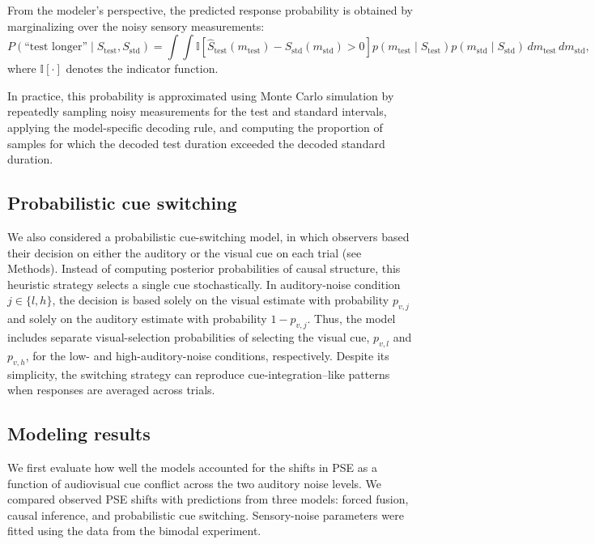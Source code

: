 \documentclass{jov}
\begin{document}
From the modeler's perspective, the predicted response probability is obtained by marginalizing over the noisy sensory measurements:
\begin{equation}
P(\text{``test longer''}\mid S_{\mathrm{test}},S_{\mathrm{std}})
=
\int \int
\mathbb{I}
\!\left[
\hat S_{\mathrm{test}}(m_{\mathrm{test}})
-
\hat S_{\mathrm{std}}(m_{\mathrm{std}})
>0
\right]
p(m_{\mathrm{test}}\mid S_{\mathrm{test}})
p(m_{\mathrm{std}}\mid S_{\mathrm{std}})
\,dm_{\mathrm{test}}\,dm_{\mathrm{std}},
\end{equation}
where $\mathbb{I}[\cdot]$ denotes the indicator function.

In practice, this probability is approximated using Monte Carlo simulation by repeatedly sampling noisy measurements for the test and standard intervals, applying the model-specific decoding rule, and computing the proportion of samples for which the decoded test duration exceeded the decoded standard duration.

\subsection{Probabilistic cue switching}
We also considered a probabilistic cue-switching model, in which observers based their decision on either the auditory or the visual cue on each trial (see Methods). Instead of computing posterior probabilities of causal structure, this heuristic strategy selects a single cue stochastically. In auditory-noise condition $j\in\{l,h\}$, the decision is based solely on the visual estimate with probability $p_{v,j}$ and solely on the auditory estimate with probability $1-p_{v,j}$. Thus, the model includes separate visual-selection probabilities of selecting the visual cue, $p_{v,l}$ and $p_{v,h}$, for the low- and high-auditory-noise conditions, respectively. Despite its simplicity, the switching strategy can reproduce cue-integration--like patterns when responses are averaged across trials.

\subsection{Modeling results}

We first evaluate how well the models accounted for the shifts in PSE as a function of audiovisual cue conflict across the two auditory noise levels. We compared observed PSE shifts with predictions from three models: forced fusion, causal inference, and probabilistic cue switching. Sensory-noise parameters were fitted using the data from the bimodal experiment. 
\end{document}

